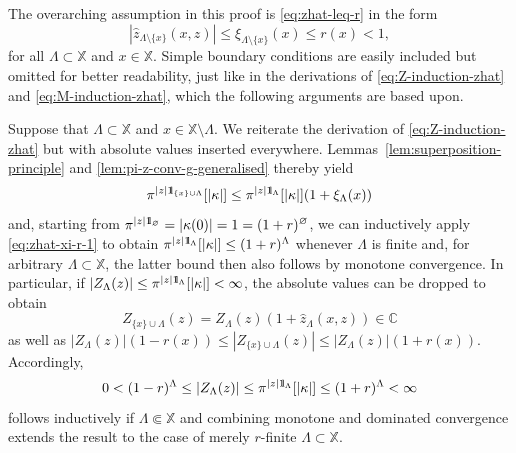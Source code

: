 \documentclass[10pt,a4paper]{amsart}
\newcommand{\C}{\mathbb{C}}
\newcommand{\X}{\mathbb X}
\newcommand{\be}{\begin{equation}}
\newcommand{\ee}{\end{equation}}
\def\1{{\mathchoice {1\mskip-4mu\mathrm l}      
{1\mskip-4mu\mathrm l}
{1\mskip-4.5mu\mathrm l} {1\mskip-5mu\mathrm l}}}
\begin{document}
The overarching assumption in this proof is \eqref{eq:zhat-leq-r} in the form
\be \label{eq:zhat-xi-r-1}
	|\widehat z_{\Lambda \setminus \{x\}}(x, z)| \leq \xi_{\Lambda \setminus \{x\}}(x) \leq r(x) < 1,
\ee
for all $\Lambda \subset \X$ and $x \in \X$. 
Simple boundary conditions are easily included but omitted for better readability, just like in the derivations of \eqref{eq:Z-induction-zhat} and \eqref{eq:M-induction-zhat}, which the following arguments are based upon.

Suppose that $\Lambda \subset \X$ and $x \in \X \setminus \Lambda$. 
We reiterate the derivation of \eqref{eq:Z-induction-zhat} but with absolute values inserted everywhere.  Lemmas~\ref{lem:superposition-principle} and \ref{lem:pi-z-conv-g-generalised} thereby yield
\[
	\pi^{|z| \1_{\{x\} \cup \Lambda}}[|\kappa|] \leq \pi^{|z| \1_\Lambda}[|\kappa|] (1 + \xi_\Lambda(x))
\]
and, starting from $\pi^{|z| \1_\varnothing} = |\kappa(0)| = 1 = (1 + r)^\varnothing$, we can inductively apply \eqref{eq:zhat-xi-r-1} to obtain $\pi^{|z| \1_\Lambda}[|\kappa|] \leq (1 + r)^\Lambda$ whenever $\Lambda$ is finite and, for arbitrary $\Lambda \subset \X$, the latter bound then also follows by monotone convergence. 
In particular, if $|Z_\Lambda(z)| \leq \pi^{|z| \1_\Lambda}[|\kappa|] < \infty$, the absolute values can be dropped to obtain
\[
	Z_{\{x\} \cup \Lambda}(z) = Z_\Lambda(z) (1 + \widehat z_\Lambda(x, z)) \in \C
\]
as well as $|Z_\Lambda(z)| (1 - r(x)) \leq |Z_{\{x\} \cup \Lambda}(z)| \leq |Z_\Lambda(z)| (1 + r(x))$. 
Accordingly,
\[
	0 < (1 - r)^\Lambda \leq |Z_\Lambda(z)| \leq \pi^{|z| \1_\Lambda}[|\kappa|] \leq (1 + r)^\Lambda < \infty
\]
follows inductively if $\Lambda \Subset \X$ and combining monotone and dominated convergence extends the result to the case of merely $r$-finite $\Lambda \subset \X$.
\end{document}
